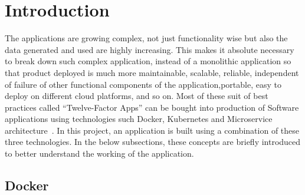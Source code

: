 

\maketitle

\section{Introduction}


The applications are growing complex, not just functionality wise but
also the data generated and used are highly increasing. This makes it
absolute necessary to break down such complex application, instead of
a monolithic application so that product deployed is much more
maintainable, scalable, reliable, independent of failure of other
functional components of the application,portable, easy to deploy on
different cloud platforms, and so on. Most of these suit of best
practices called “Twelve-Factor Apps” can be bought into production of
Software applications using technologies such Docker, Kubernetes and
Microservice architecture~\cite{hid-sp18-602-twelve-factor}. In this
project, an application is built using a combination of these
three technologies. In the below subsections, these concepts are
briefly introduced to better understand the working of the
application.


\subsection{Docker}

